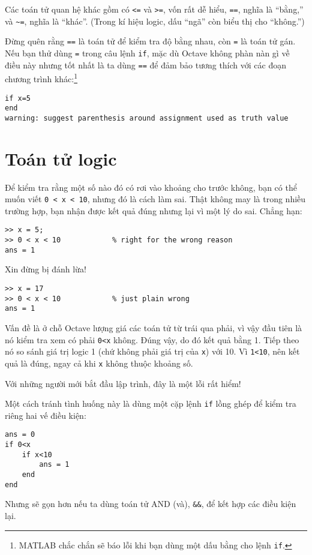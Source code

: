 \documentclass[12pt]{book}
\begin{document}
Các toán tử quan hệ khác gồm có {\tt <=} và {\tt >=}, vốn
rất dễ hiểu, {\tt ==}, nghĩa là ``bằng,'' và
\verb+~=+, nghĩa là ``khác''.  (Trong kí hiệu logic, dấu ``ngã''
còn biểu thị cho ``không.'')

Đừng quên rằng {\tt ==} là toán tử để kiểm tra độ bằng nhau, còn
{\tt =} là toán tử gán. Nếu bạn thử dùng {\tt =} trong
câu lệnh {\tt if}, mặc dù Octave không phàn nàn gì về
điều này nhưng tốt nhất là ta dùng {\tt ==} để đảm bảo 
tương thích với các đoạn chương trình khác:\footnote{MATLAB
chắc chắn sẽ báo lỗi khi bạn dùng một dấu bằng cho lệnh \texttt{if}.}

\begin{verbatim}
if x=5
end
warning: suggest parenthesis around assignment used as truth value
\end{verbatim}
%


\section{Toán tử logic}
\label{logop}

Để kiểm tra rằng một số nào đó có rơi vào khoảng cho trước không,
bạn có thể muốn viết {\tt 0 < x < 10}, nhưng đó là cách làm sai.
Thật không may là trong nhiều trường hợp, bạn nhận được
kết quả đúng nhưng lại vì một lý do sai. Chẳng hạn:

\begin{verbatim}
>> x = 5;
>> 0 < x < 10            % right for the wrong reason
ans = 1
\end{verbatim}
%
Xin đừng bị đánh lừa!

\begin{verbatim}
>> x = 17
>> 0 < x < 10            % just plain wrong
ans = 1
\end{verbatim}
%
Vấn đề là ở chỗ Octave lượng giá các toán tử từ trái qua phải,
vì vậy đầu tiên là nó kiểm tra xem có phải {\tt 0<x} không. 
Đúng vậy, do đó kết quả bằng 1. Tiếp theo nó so sánh giá trị
logic 1 (chứ không phải giá trị của {\tt x}) với 10.  
Vì {\tt 1<10}, nên kết quả là đúng, ngay cả khi {\tt x}
không thuộc khoảng số.

Với những người mới bắt đầu lập trình, đây là một lỗi rất hiểm!

Một cách tránh tình huống này là dùng một cặp lệnh {\tt if} 
lồng ghép để kiểm tra riêng hai vế điều kiện:

\begin{verbatim}
ans = 0
if 0<x
    if x<10
        ans = 1
    end
end
\end{verbatim}
%
Nhưng sẽ gọn hơn nếu ta dùng toán tử AND (và), {\tt \&\&}, 
để kết hợp các điều kiện lại.
\end{document}
